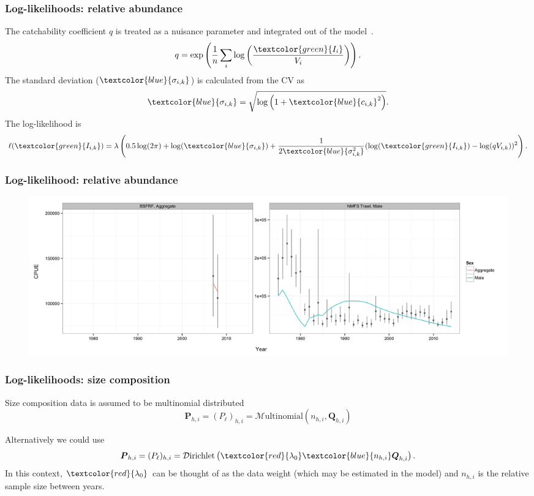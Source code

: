 \documentclass{beamer}
\begin{document}
\begin{frame}
\frametitle{Log-likelihoods: relative abundance}
The catchability coefficient $q$ is treated as a nuisance parameter and
integrated out of the model~\citep{Walters1994}.
\begin{equation*}
  q = \exp \left( \frac{1}{n} \sum_i \log \left(
      \frac{\textcolor{green}{I_i}}{V_i} \right) \right).
\end{equation*}
The standard deviation ($\textcolor{blue}{\sigma_{i,k}}$) is calculated from the CV as
\begin{equation*}
  \textcolor{blue}{\sigma_{i,k}} = \sqrt{\log \left(
      1+\textcolor{blue}{c_{i,k}}^2 \right)}.
\end{equation*}
The log-likelihood is
\begin{equation*}
  \ell(\textcolor{green}{I_{i,k}}) = \lambda \left( 0.5 \log (2 \pi) + \log
  (\textcolor{blue}{\sigma_{i,k}}) +
  \frac{1}{2\textcolor{blue}{\sigma^2_{i,k}}} (\log (\textcolor{green}{I_{i,k}}) -
  \log (qV_{i,k}))^2 \right).
\end{equation*}
\end{frame}


\begin{frame}
\frametitle{Log-likelihood: relative abundance}
\begin{figure}[!htbp]
  \centering
  \includegraphics[width=\linewidth]{../../examples/bbrkc/OneSex/figure/cpue.png}
\end{figure}
\end{frame}


\begin{frame}
\frametitle{Log-likelihoods: size composition}
Size composition data is assumed to be multinomial distributed
\begin{equation*}
  \boldsymbol{P}_{h,i} = (P_\ell)_{h,i} = \mathcal{M}\text{ultinomial} \left( n_{h,i},
  \boldsymbol{Q}_{h,i} \right)
\end{equation*}

Alternatively we could use
\begin{equation*}
  \boldsymbol{P}_{h,i} = (P_\ell)_{h,i} = \mathcal{D}\text{irichlet} \left(
    \textcolor{red}{\lambda_0} \textcolor{blue}{n_{h,i}} \boldsymbol{Q}_{h,i} \right).
\end{equation*}
In this context, $\textcolor{red}{\lambda_0}$ can be thought of as the data
weight (which may be estimated in the model) and $n_{h,i}$ is the relative
sample size between years.
\end{frame}
\end{document}
